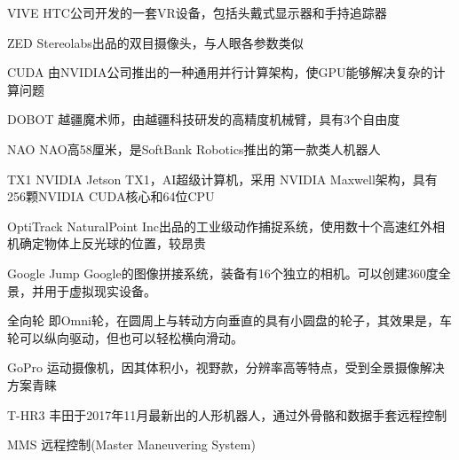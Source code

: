 \begin{denotation}[3cm]
\item[VIVE] HTC公司开发的一套VR设备，包括头戴式显示器和手持追踪器
\item[ZED] Stereolabs出品的双目摄像头，与人眼各参数类似
\item[CUDA] 由NVIDIA公司推出的一种通用并行计算架构，使GPU能够解决复杂的计算问题
\item[DOBOT] 越疆魔术师，由越疆科技研发的高精度机械臂，具有3个自由度
\item[NAO] NAO高58厘米，是SoftBank Robotics推出的第一款类人机器人
\item[TX1]  NVIDIA Jetson TX1，AI超级计算机，采用 NVIDIA Maxwell架构，具有256颗NVIDIA CUDA核心和64位CPU
\item[OptiTrack]  NaturalPoint Inc出品的工业级动作捕捉系统，使用数十个高速红外相机确定物体上反光球的位置，较昂贵
\item[Google Jump] Google的图像拼接系统，装备有16个独立的相机。可以创建360度全景，并用于虚拟现实设备。
\item[全向轮] 即Omni轮，在圆周上与转动方向垂直的具有小圆盘的轮子，其效果是，车轮可以纵向驱动，但也可以轻松横向滑动。
\item[GoPro] 运动摄像机，因其体积小，视野款，分辨率高等特点，受到全景摄像解决方案青睐
\item[T-HR3]丰田于2017年11月最新出的人形机器人，通过外骨骼和数据手套远程控制
\item[MMS]远程控制(Master Maneuvering System)

\end{denotation}
